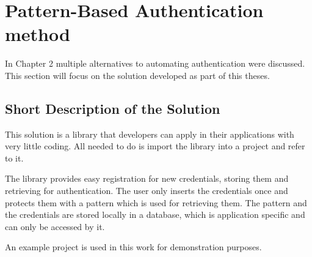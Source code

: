 
\chapter{Pattern-Based Authentication method} %

In Chapter 2 multiple alternatives to automating authentication were discussed. This section will focus on the solution developed as part of this theses. 



\ifpdf
    \graphicspath{{X/figures/PNG/}{X/figures/PDF/}{X/figures/}}
\else
    \graphicspath{{X/figures/EPS/}{X/figures/}}
\fi

\section{Short Description of the Solution}
This solution is a library that developers can apply in their applications with very little coding. All needed to do is import the library into a project and refer to it.

The library provides easy registration for new credentials, storing them and retrieving for authentication. The user only inserts the credentials once and protects them with a pattern which is used for retrieving them. The pattern and the credentials are stored locally in a database, which is application specific and can only be accessed by it. 

An example project is used in this work for demonstration purposes.

\newpage

